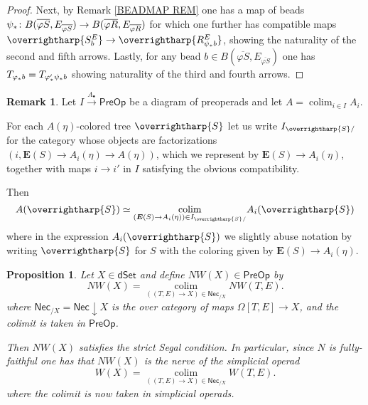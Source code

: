 \documentclass[a4paper,10pt
,draft
]{article}%
\numberwithin{equation}{section}
\numberwithin{figure}{section}
\newtheorem{proposition}[equation]{Proposition}%
\theoremstyle{definition} %
\newtheorem{remark}[equation]{Remark}%
\newcommand{\vect}[1]{\text{\overrightharp{\ensuremath{#1}}}}
\DeclareMathOperator{\colim}{colim}%
\newcommand{\1}{\ensuremath{\mathbbm 1}}%
\begin{document}
\begin{proof}
Next, by Remark \ref{BEADMAP REM}
one has a map of beads
$\psi_{\**} \colon 
B(\overline{\varphi S},E_{\overline{\varphi S}})
\to
B(\overline{\varphi R},E_{\overline{\varphi R}})$
for which one further has compatible maps
$\vect{S^{E}_b}
\to 
\vect{R^{E}_{\psi_{\**}b}}$,
showing the naturality of the second and fifth arrows.
Lastly, for any bead 
$b \in B(\overline{\varphi S},E_{\overline{\varphi S}})$
one has
$T_{\varphi_{\**}b} = T_{\varphi'_{\**} \psi_{\**}b}$
showing naturality of the third and fourth arrows.
\end{proof}




\begin{remark}\label{PREOPCOLEV REM}
	Let $I \xrightarrow{A_{\bullet}} \mathsf{PreOp}$
	be a diagram of preoperads and let
	$A = \colim_{i \in I} A_i$.
	
	For each $A(\eta)$-colored tree $\vect{S}$
	let us write
	$I_{\vect{S}/}$
	for the category whose objects are factorizations
	$(i,\boldsymbol{E}(S) \to A_i(\eta) \to A(\eta))$,
	which we represent by 
	$\boldsymbol{E}(S) \to A_i(\eta)$,
	together with maps $i \to i'$ in $I$
	satisfying the obvious compatibility.
	
	Then
\[
	A(\vect{S}) \simeq 
	\underset{(\boldsymbol{E}(S) \to A_i(\eta)) \in I_{\vect{S}/}}{\colim}
	A_i(\vect{S})
\]
where in the expression $A_i(\vect{S})$
we slightly abuse notation by writing $\vect{S}$
for $S$ with the coloring given by
$\boldsymbol{E}(S) \to A_i(\eta)$.
\end{remark}





\begin{proposition}
      \label{NWKANEX_PROP}
	Let $X \in \mathsf{dSet}$ and define
	$NW(X) \in \mathsf{PreOp}$ by
\begin{equation}\label{NWKANEX EQ}
	NW(X) =
	\underset{((T,E) \to X)
	\in \mathsf{Nec}_{/X}}{\colim}
	NW(T,E).
\end{equation}
where
$\mathsf{Nec}_{/X} = \mathsf{Nec} \downarrow X$ is the over category of maps $\Omega[T,E] \to X$, and
the colimit is taken in $\mathsf{PreOp}$.
	
	Then $NW(X)$ satisfies the strict Segal condition.
%
	In particular, since $N$ is fully-faithful one has that
	$NW(X)$ is the nerve of the simplicial operad
\[
W(X) =
\underset{((T,E) \to X)
	\in \mathsf{Nec}_{/X}}{\colim}
W(T,E).
\]
where the colimit is now taken in simplicial operads.
\end{proposition}
\end{document}
